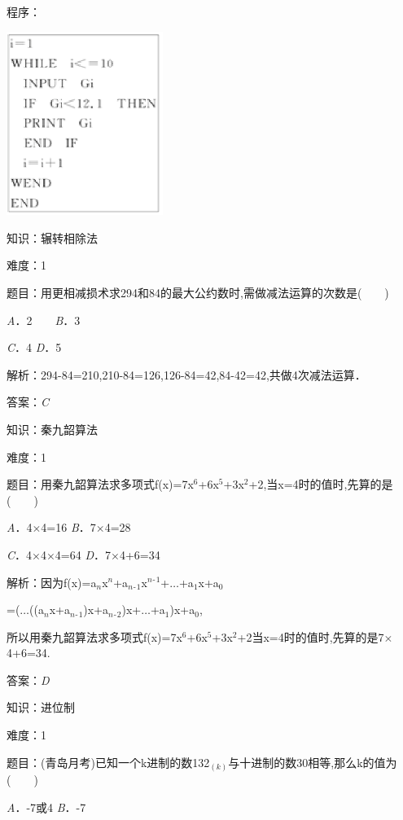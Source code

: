 \documentclass{article} %
\begin{document}
程序：

\includegraphics*[width=2.00in, height=2.35in, keepaspectratio=false]{image75}




知识：辗转相除法

难度：1

题目：用更相减损术求294和84的最大公约数时,需做减法运算的次数是(　　)

\textit{A}．2　　\textit{B}．3

\textit{C}．4    \textit{D}．5

解析：294-84=210,210-84=126,126-84=42,84-42=42,共做4次减法运算．

答案：\textit{C}

知识：秦九韶算法

难度：1

题目：用秦九韶算法求多项式f(x)=7x${}^{6}$+6x${}^{5}$+3x${}^{2}$+2,当x=4时的值时,先算的是(　　)

\textit{A}．4$\mathrm{\times}$4=16     \textit{B}．7$\mathrm{\times}$4=28

\textit{C}．4$\mathrm{\times}$4$\mathrm{\times}$4=64  \textit{D}．7$\mathrm{\times}$4+6=34

解析：因为f(x)=a${}_{n}$x${}^{n}$+a${}_{n}$${}_{\textrm{-}}$${}_{1}$x${}^{n}$${}^{\textrm{-}}$${}^{1}$+$\dots$+a${}_{1}$x+a${}_{0}$

=($\dots$((a${}_{n}$x+a${}_{n}$${}_{\textrm{-}}$${}_{1}$)x+a${}_{n}$${}_{\textrm{-}}$${}_{2}$)x+$\dots$+a${}_{1}$)x+a${}_{0}$,

所以用秦九韶算法求多项式f(x)=7x${}^{6}$+6x${}^{5}$+3x${}^{2}$+2当x=4时的值时,先算的是7$\mathrm{\times}$4+6=34.

答案：\textit{D}

知识：进位制

难度：1

题目：(青岛月考)已知一个k进制的数132${}_{(k)}$与十进制的数30相等,那么k的值为(　　)

\textit{A}．-7或4  \textit{B}．-7
\end{document}
